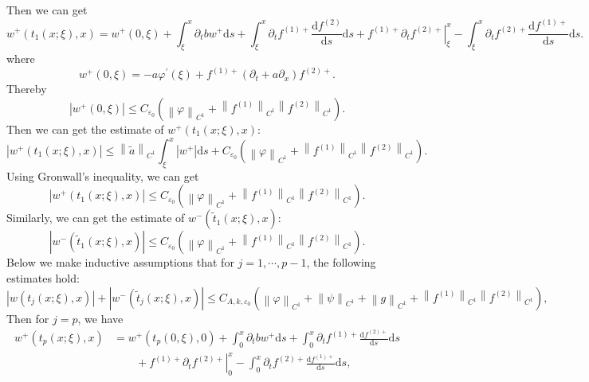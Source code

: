 \documentclass[a4paper,reqno,11pt]{amsart}
\numberwithin{equation}{section} %
\begin{document}
Then we can get
\begin{equation}\label{e of w^+ 1}
w^+\left( t_1(x;\xi ),x \right) =w^+(0,\xi )+\int_{\xi}^x{\partial _tbw^+\mathrm{d}s}+\int_{\xi}^x{\partial _tf^{(1)+}\frac{\mathrm{d}f^{(2)}}{\mathrm{d}s}\mathrm{d}s}+\left. f^{(1)+}\partial _tf^{(2)+} \right|_{\xi}^{x}-\int_{\xi}^x{\partial _t{f}^{(2)+}\frac{\mathrm{d}{f}^{(1)+}}{\mathrm{d}s}\mathrm{d}s}.
\end{equation}
where
\begin{equation}\label{w^+ at 0}
w^+(0, \xi)=-a \varphi^{\prime}(\xi)+f^{(1)+}\left(\partial_t+a \partial_x\right) f^{(2)+} .
\end{equation}
Thereby
$$
\left| w^+(0,\xi ) \right|\leq C_{\varepsilon _0}\left( \left\| \varphi \right\| _{C^1}+\left\| f^{\left( 1 \right)} \right\| _{C^1}\left\| f^{(2)} \right\| _{C^1} \right) .
$$
Then we can get the estimate of $w^+\left( t_1(x;\xi ),x \right) $:
$$
\left| w^+\left( t_1(x;\xi ),x \right) \right|\leq \left\| \tilde{a} \right\| _{C^1}\int_{\xi}^x{\left| w^+ \right|\mathrm{d}s}+C_{\varepsilon _0}\left( \left\| \varphi \right\| _{C^1}+\left\| f^{(1)} \right\| _{C^1}\left\| f^{(2)} \right\| _{C^1} \right) .
$$
Using Gronwall's inequality, we can get
$$
\left| w^+\left( t_1(x;\xi ),x \right) \right|\leq C_{\varepsilon _0}\left( \left\| \varphi \right\| _{C^1}+\left\| f^{(1)} \right\| _{C^1}\left\| f^{(2)} \right\| _{C^1} \right) .
$$
Similarly, we can get the estimate of $w^-\left( \tilde{t} _1(x;\xi ),x \right) $:
$$
\left| w^-\left( \tilde{t} _1(x;\xi ),x \right) \right|\leq C_{\varepsilon _0}\left( \left\| \varphi \right\| _{C^1}+\left\| f^{(1)} \right\| _{C^1}\left\| f^{(2)} \right\| _{C^1} \right) .
$$
Below we make inductive assumptions that for $j=1,\cdots,p-1$, the following estimates hold:
\begin{equation}\label{inductive assumption for w}
\left| w\left( t_j(x;\xi ),x \right) \right| +  \left| w^-\left( \tilde{t}_j(x;\xi ),x \right) \right|\leq C_{A,k,\varepsilon _0}\left( \left\| \varphi \right\| _{C^1}+\left\| \psi \right\| _{C^1}+\left\| g \right\| _{C^1}+\left\| f^{(1)} \right\| _{C^1}\left\| f^{(2)} \right\| _{C^1} \right) ,
\end{equation}
Then for $j=p$, we have
\begin{equation}\label{e of w^+ p}
  \begin{aligned}
	w^+\left( t_p(x;\xi ),x \right) &=w^+(t_p(0,\xi ),0)+\int_{0}^x{\partial _tbw^+\mathrm{d}s}+\int_{0}^x{\partial _tf^{(1)+}\frac{\mathrm{d}f^{(2)+}}{\mathrm{d}s}\mathrm{d}s}\\
  & \qquad+\left. f^{(1)+}\partial _tf^{(2)+} \right|_{0}^{x}-\int_{0}^x{\partial _t{f}^{(2)+}\frac{\mathrm{d}{f}^{(1)+}}{\mathrm{d}s}\mathrm{d}s},
  \end{aligned}
\end{equation}
\end{document}

